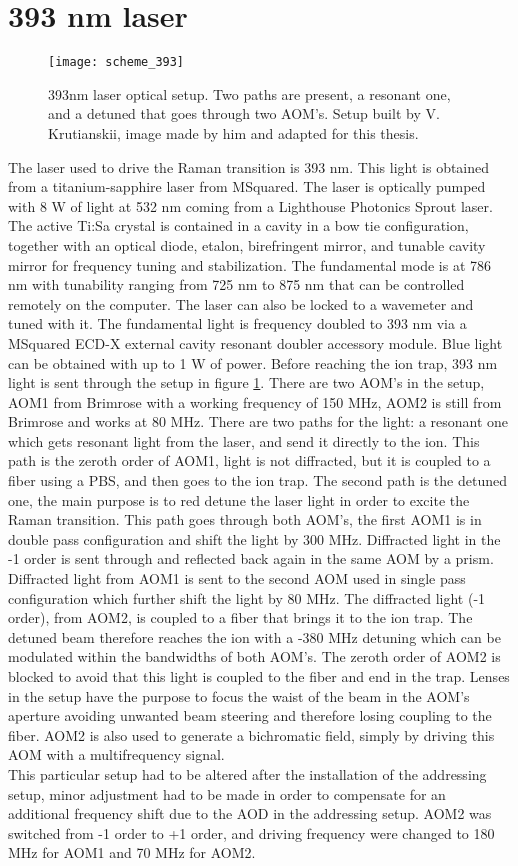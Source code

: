 \section{393 nm laser}
\begin{figure}
\centering
\texttt{[image: scheme\_393]}
\caption{393nm laser optical setup. Two paths are present, a resonant one, and a detuned that goes through two AOM's. Setup built by V. Krutianskii, image made by him and adapted for this thesis.}
\label{scheme393}
\end{figure}
The laser used to drive the Raman transition is 393 nm. This light is obtained from a titanium-sapphire laser from MSquared. The laser is optically pumped with 8 W of light at 532 nm coming from a Lighthouse Photonics Sprout laser. The active Ti:Sa crystal is contained in a cavity in a bow tie configuration, together with an optical diode, etalon, birefringent mirror, and tunable cavity mirror for frequency tuning and stabilization. The fundamental mode is at 786 nm with tunability ranging from 725 nm to 875 nm that can be controlled remotely on the computer. The laser can also be locked to a wavemeter and tuned with it.
The fundamental light is frequency doubled to 393 nm via a MSquared ECD-X external cavity resonant doubler accessory module. Blue light can be obtained with up to 1 W of power. Before reaching the ion trap, 393 nm light is sent through the setup in figure \ref{scheme393}. There are two AOM's in the setup, AOM1 from Brimrose with a working frequency of 150 MHz, AOM2 is still from Brimrose and works at 80 MHz. There are two paths for the light: a resonant one which gets resonant light from the laser, and send it directly to the ion. This path is the zeroth order of AOM1, light is not diffracted, but it is coupled to a fiber using a PBS, and then goes to the ion trap. The second path is the detuned one, the main purpose is to red detune the laser light in order to excite the Raman transition. This path goes through both AOM's, the first AOM1 is in double pass configuration and shift the light by 300 MHz. Diffracted light in the -1 order is sent through and reflected back again in the same AOM by a prism. Diffracted light from AOM1 is sent to the second AOM used in single pass configuration which further shift the light by 80 MHz. The diffracted light (-1 order), from AOM2, is coupled to a fiber that brings it to the ion trap. The detuned beam therefore reaches the ion with a -380 MHz detuning which can be modulated within the bandwidths of both AOM's. The zeroth order of AOM2 is blocked to avoid that this light is coupled to the fiber and end in the trap. Lenses in the setup have the purpose to focus the waist of the beam in the AOM's aperture avoiding unwanted beam steering and therefore losing coupling to the fiber.
AOM2 is also used to generate a bichromatic field, simply by driving this AOM with a multifrequency signal.\\
This particular setup had to be altered after the installation of the addressing setup, minor adjustment had to be made in order to compensate for an additional frequency shift due to the AOD in the addressing setup. AOM2 was switched from -1 order to +1 order, and driving frequency were changed to 180 MHz for AOM1 and 70 MHz for AOM2.

